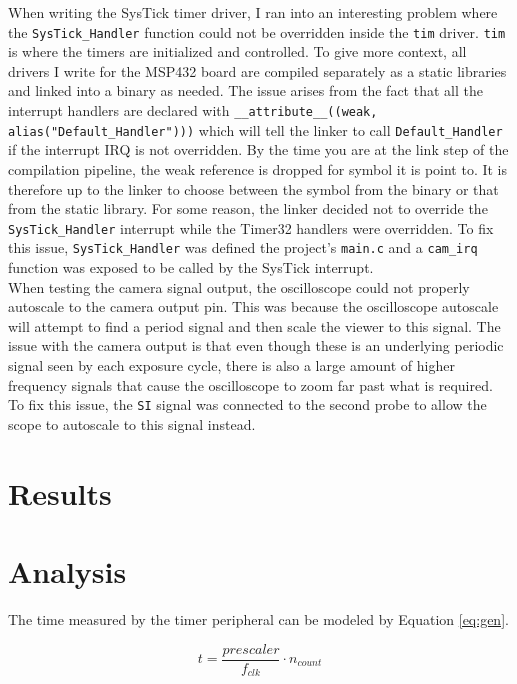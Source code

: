 \documentclass[CMPE]{../KGCOEReport}
\def\code#1{\texttt{#1}}
\begin{document}
	When writing the SysTick timer driver, I ran into an interesting problem where the
	\code{SysTick\_Handler} function could not be overridden inside the \code{tim}
	driver. \code{tim} is where the timers are initialized and controlled.
	To give more context, all drivers I write for the MSP432 board are compiled
	separately as a static libraries and linked into a binary as needed.
	The issue arises from the fact
	that all the interrupt handlers are declared with \code{\_\_attribute\_\_((weak, alias("Default\_Handler")))} which will tell the linker to call \code{Default\_Handler}
	if the interrupt IRQ is not overridden. By the time you are at the link step of the
	compilation pipeline, the weak reference is dropped for symbol it is point to. It is
	therefore up to the linker to choose between the symbol from the binary or that
	from the static library. For some reason,
	the linker decided not to override the \code{SysTick\_Handler} interrupt while the
	Timer32 handlers were overridden. To fix this issue, \code{SysTick\_Handler} was
	defined the project's \code{main.c} and a \code{cam\_irq} function was exposed to
	be called by the SysTick interrupt. \\

	When testing the camera signal output, the oscilloscope could not properly autoscale
	to the camera output pin. This was because the oscilloscope autoscale will attempt
	to find a period signal and then scale the viewer to this signal. The issue with
	the camera output is that even though these is an underlying periodic signal
	seen by each exposure cycle, there is also a large amount of higher frequency
 	signals that cause the oscilloscope to zoom far past what is required. To fix this
 	issue, the \code{SI} signal was connected to the second probe to allow the scope to
 	autoscale to this signal instead.

    \section*{Results}


	\section*{Analysis}

	The time measured by the timer peripheral can be modeled by Equation \ref{eq:gen}.
	
	\begin{equation}
	t = \frac{prescaler}{f_{clk}} \cdot n_{count}
	\label{eq:gen}
	\end{equation}
\end{document}
